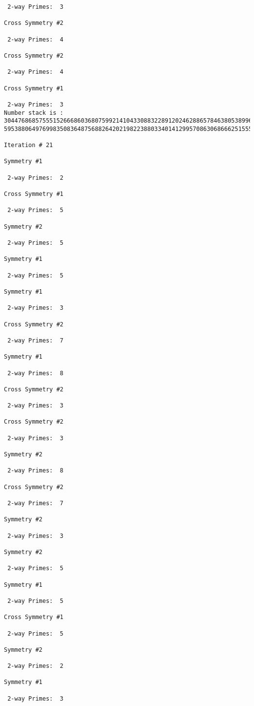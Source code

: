 \begin{verbatim}
 2-way Primes: 	3

Cross Symmetry #2

 2-way Primes: 	4

Cross Symmetry #2

 2-way Primes: 	4

Cross Symmetry #1

 2-way Primes: 	3
Number stack is :
30447686857555152666860368075992141043308832289120246288657846380538996794608835958544046240163340857
59538806497699835083648756882642021982238803340141299570863068666251555758686744037580433610426404458

Iteration #	21

Symmetry #1

 2-way Primes: 	2

Cross Symmetry #1

 2-way Primes: 	5

Symmetry #2

 2-way Primes: 	5

Symmetry #1

 2-way Primes: 	5

Symmetry #1

 2-way Primes: 	3

Cross Symmetry #2

 2-way Primes: 	7

Symmetry #1

 2-way Primes: 	8

Cross Symmetry #2

 2-way Primes: 	3

Cross Symmetry #2

 2-way Primes: 	3

Symmetry #2

 2-way Primes: 	8

Cross Symmetry #2

 2-way Primes: 	7

Symmetry #2

 2-way Primes: 	3

Symmetry #2

 2-way Primes: 	5

Symmetry #1

 2-way Primes: 	5

Cross Symmetry #1

 2-way Primes: 	5

Symmetry #2

 2-way Primes: 	2

Symmetry #1

 2-way Primes: 	3


\end{verbatim}
